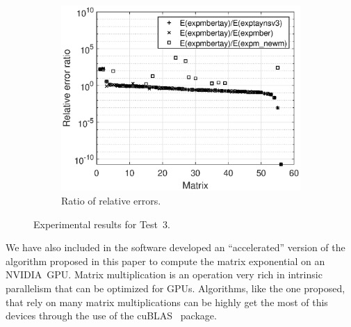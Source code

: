 \documentclass[preprint,10pt,numbers,sort&compress]{elsarticle}
\newcommand{\nvidia}{NVIDIA}
\begin{document}
\begin{figure}[t]
\begin{subfigure}[b]{0.48\textwidth}
\vspace{12pt}
\end{subfigure}
\begin{subfigure}[b]{0.48\textwidth}
\includegraphics[scale=0.44]{error_ratio_exp_toolbox_n128_nd256-exp_eigtool_n128_nd256_expmbertay.eps}
\caption{\footnotesize Ratio of relative errors.}
\label{fig:test6_c}
\end{subfigure}
\caption{Experimental results for Test~3.}
\label{fig:test6}
\end{figure}


We have also included in the software developed an ``accelerated'' version of the algorithm proposed in this paper to compute the matrix exponential on an \nvidia\ GPU.
Matrix multiplication is an operation very rich in intrinsic parallelism that can be optimized for GPUs.  
Algorithms, like the one proposed, that rely on many matrix multiplications can be highly get the most of this devices through the use of the cuBLAS~\cite{CuLi09} package.


\end{document}
